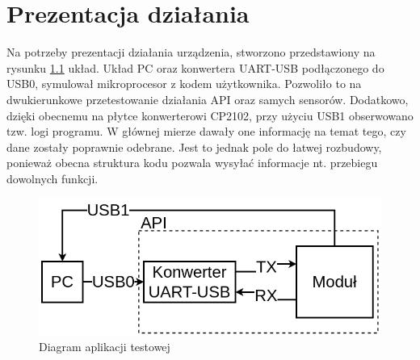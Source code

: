 \chapter{Prezentacja działania}
\label{cha:presentation}
Na potrzeby prezentacji działania urządzenia, stworzono przedstawiony na rysunku \ref{img:test_diagram} układ. Układ PC oraz konwertera UART-USB podłączonego do USB0, symulował mikroprocesor z kodem użytkownika. Pozwoliło to na dwukierunkowe przetestowanie działania API oraz samych sensorów. Dodatkowo, dzięki obecnemu na płytce konwerterowi CP2102, przy użyciu USB1 obserwowano tzw. logi programu. W głównej mierze dawały one informację na temat tego, czy dane zostały poprawnie odebrane. Jest to jednak pole do łatwej rozbudowy, ponieważ obecna struktura kodu pozwala wysyłać informacje nt. przebiegu dowolnych funkcji.

\begin{figure}[H]
    \centering
    \includegraphics[width=\textwidth, height=\textheight, keepaspectratio]{Graphics/test_sch.png}
    \caption{Diagram aplikacji testowej}
    \label{img:test_diagram}
\end{figure}

